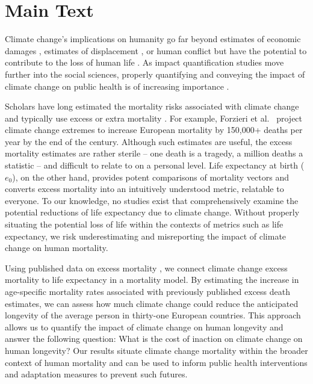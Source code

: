\documentclass[12pt]{article}
\begin{document}
\newpage
{} %

\hypertarget{main-text}{%
\section{Main Text}\label{main-text}}

Climate change's implications on humanity go far beyond estimates of
economic damages \citep{hsiang2017estimating}, estimates of displacement
\citep{rigaud2018groundswell}, or human conflict
\citep{barnett2007climate} but have the potential to contribute to the
loss of human life \citep{forzieri2017increasing, pachauri2014climate}.
As impact quantification studies move further into the social sciences,
properly quantifying and conveying the impact of climate change on
public health is of increasing importance
\citep{melillo2014climate, cloyd2016engagement}.

Scholars have long estimated the mortality risks associated with climate
change and typically use excess or extra mortality
\citep{forzieri2017increasing, wilson2017climate, mcmichael2006climate, zanobetti2012summer}.
For example, Forzieri et al.~\citeyearpar{forzieri2017increasing}
project climate change extremes to increase European mortality by
150,000+ deaths per year by the end of the century. Although such
estimates are useful, the excess mortality estimates are rather sterile
-- one death is a tragedy, a million deaths a statistic -- and difficult
to relate to on a personal level. Life expectancy at birth (\(e_0\)), on
the other hand, provides potent comparisons of mortality vectors and
converts excess mortality into an intuitively understood metric,
relatable to everyone. To our knowledge, no studies exist that
comprehensively examine the potential reductions of life expectancy due
to climate change. Without properly situating the potential loss of life
within the contexts of metrics such as life expectancy, we risk
underestimating and misreporting the impact of climate change on human
mortality.

Using published data on excess mortality \citep{forzieri2017increasing},
we connect climate change excess mortality to life expectancy in a
mortality model. By estimating the increase in age-specific mortality
rates associated with previously published excess death estimates, we
can assess how much climate change could reduce the anticipated
longevity of the average person in thirty-one European countries. This
approach allows us to quantify the impact of climate change on human
longevity and answer the following question: What is the cost of
inaction on climate change on human longevity? Our results situate
climate change mortality within the broader context of human mortality
and can be used to inform public health interventions and adaptation
measures to prevent such futures.
\end{document}
